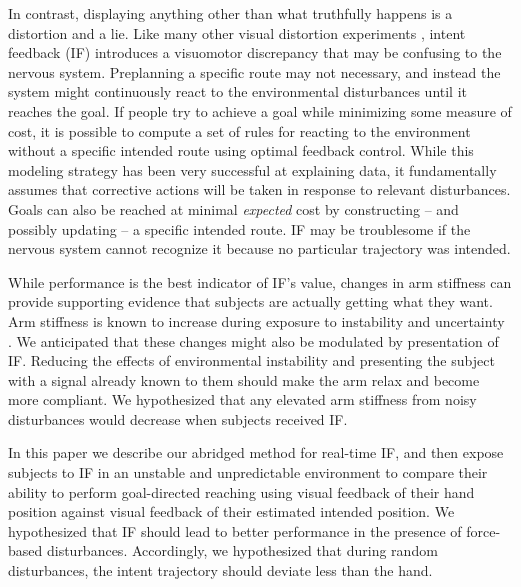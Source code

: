 \documentclass{frontiersSCNS} %
\begin{document}
In contrast, displaying anything other than what truthfully happens is a distortion and a lie. Like many other visual distortion experiments \citep{miles1980long, pine1996learning}, intent feedback (IF) introduces a visuomotor discrepancy that may be confusing to the nervous system. Preplanning a specific route may not necessary, and instead the system might continuously react to the environmental disturbances until it reaches the goal. If people try to achieve a goal while minimizing some measure of cost, it is possible to compute a set of rules for reacting to the environment without a specific intended route using optimal feedback control\citep{todorov2002optimal}. While this modeling strategy has been very successful at explaining data, it fundamentally assumes that corrective actions will be taken in response to relevant disturbances. Goals can also be reached at minimal \textit{expected} cost by constructing -- and possibly updating -- a specific intended route. IF may be troublesome if the nervous system cannot recognize it because no particular trajectory was intended.

While performance is the best indicator of IF's value, changes in arm stiffness can provide supporting evidence that subjects are actually getting what they want. Arm stiffness is known to increase during exposure to instability \citep{franklin2003adaptation} and uncertainty \citep{takahashi2001impedance}. We anticipated that these changes might also be modulated by presentation of IF. Reducing the effects of environmental instability and presenting the subject with a signal already known to them should make the arm relax and become more compliant. We hypothesized that any elevated arm stiffness from noisy disturbances would decrease when subjects received IF.

In this paper we describe our abridged method for real-time IF, and then expose subjects to IF in an unstable and unpredictable environment to compare their ability to perform goal-directed reaching using visual feedback of their hand position against visual feedback of their estimated intended position. We hypothesized that IF should lead to better performance in the presence of force-based disturbances. Accordingly, we hypothesized that during random disturbances, the intent trajectory should deviate less than the hand.
\end{document}
